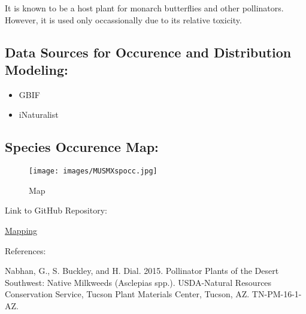\documentclass[
]{article}
\providecommand{\tightlist}{%
  \setlength{\itemsep}{0pt}\setlength{\parskip}{0pt}}
\begin{document}
It is known to be a host plant for monarch butterflies and other
pollinators. However, it is used only occassionally due to its relative
toxicity.

\hypertarget{data-sources-for-occurence-and-distribution-modeling}{%
\subsection{Data Sources for Occurence and Distribution
Modeling:}\label{data-sources-for-occurence-and-distribution-modeling}}

\begin{itemize}
\tightlist
\item
  GBIF
\item
  iNaturalist
\end{itemize}

\hypertarget{species-occurence-map}{%
\subsection{Species Occurence Map:}\label{species-occurence-map}}

\begin{figure}
\centering
\texttt{[image: images/MUSMXspocc.jpg]}
\caption{Map}
\end{figure}

Link to GitHub Repository:

\href{mapping.Rmd}{Mapping}

References:

Nabhan, G., S. Buckley, and H. Dial. 2015. Pollinator Plants of the
Desert Southwest: Native Milkweeds (Asclepias spp.). USDA-Natural
Resources Conservation Service, Tucson Plant Materials Center, Tucson,
AZ. TN-PM-16-1-AZ.
\end{document}
